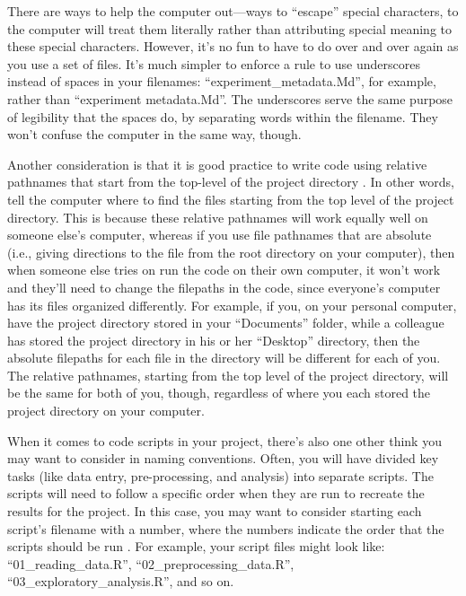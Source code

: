 \documentclass[]{tufte-book}
\begin{document}
There are ways to help the computer out---ways to ``escape'' special characters,
to the computer will treat them literally rather than attributing special
meaning to these special characters. However, it's no fun to have to do over
and over again as you use a set of files. It's much simpler to enforce a rule to
use underscores instead of spaces in your filenames: ``experiment\_metadata.Md'',
for example, rather than ``experiment metadata.Md''. The underscores serve the
same purpose of legibility that the spaces do, by separating words within the
filename. They won't confuse the computer in the same way, though.

Another consideration is that it is good practice to write code using relative pathnames that start from the
top-level of the project directory \citep{bertin2021creating}. In other words, tell
the computer where to find the files starting from the top level of the project
directory. This is because these relative pathnames will work equally well on
someone else's computer, whereas if you use file pathnames that are absolute
(i.e., giving directions to the file from the root directory on your computer),
then when someone else tries on run the code on their own computer, it won't
work and they'll need to change the filepaths in the code, since everyone's
computer has its files organized differently. For example, if you, on your
personal computer, have the project directory stored in your ``Documents'' folder,
while a colleague has stored the project directory in his or her ``Desktop''
directory, then the absolute filepaths for each file in the directory will be
different for each of you. The relative pathnames, starting from the top level
of the project directory, will be the same for both of you, though, regardless
of where you each stored the project directory on your computer.

When it comes to code scripts in your project, there's also one other think you
may want to consider in naming conventions. Often, you will have divided key
tasks (like data entry, pre-processing, and analysis) into separate scripts. The
scripts will need to follow a specific order when they are run to recreate the
results for the project. In this case, you may want to consider starting each
script's filename with a number, where the numbers indicate the order that the
scripts should be run \citep{marwick2018packaging, bertin2021creating}. For example, your script files might look like:
``01\_reading\_data.R'', ``02\_preprocessing\_data.R'', ``03\_exploratory\_analysis.R'', and
so on.
\end{document}
